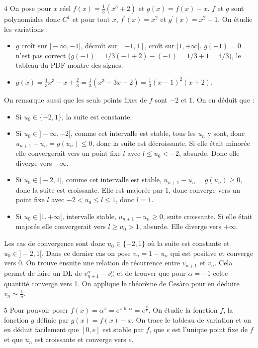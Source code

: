 \begin{correction}{4}
On pose pour $x$ réel $f(x)=\frac{1}{3}(x^{3}+2)$ et $g(x)=f(x)-x$.
$f$ et $g$ sont polynomiales donc $C^{1}$ et pour tout $x$, $f^{\prime}(x)=x^{2}$ et $g^{\prime}(x)=x^{2}-1$.
On étudie les variations :
\begin{itemize}
    \item $g$ croît sur $]-\infty, -1]$, décroît sur $[-1, 1]$, croît sur $[1, +\infty[$. $g(-1) = 0$ n'est pas correct ($g(-1) = 1/3(-1+2) - (-1) = 1/3+1 = 4/3$), le tableau du PDF montre des signes.
    \item $g(x) = \frac{1}{3}x^3 - x + \frac{2}{3} = \frac{1}{3}(x^3 - 3x + 2) = \frac{1}{3}(x-1)^2(x+2)$.
\end{itemize}
On remarque aussi que les seuls points fixes de $f$ sont $-2$ et $1$.
On en déduit que :
\begin{itemize}
    \item Si $u_{0}\in\{-2,1\}$, la suite est constante.
    \item Si $u_{0}\in]-\infty,-2[$, comme cet intervalle est stable, tous les $u_{n}$ y sont, donc $u_{n+1}-u_{n}=g(u_{n})\le0$, donc la suite est décroissante. Si elle était minorée elle convergerait vers un point fixe $l$ avec $l\le u_{0}<-2$, absurde. Donc elle diverge vers $-\infty$.
    \item Si $u_{0}\in]-2,1[$, comme cet intervalle est stable, $u_{n+1}-u_{n}=g(u_{n})\ge0$, donc la suite est croissante. Elle est majorée par 1, donc converge vers un point fixe $l$ avec $-2<u_{0}\le l\le1$, donc $l=1$.
    \item Si $u_{0}\in]1,+\infty[$, intervalle stable, $u_{n+1}-u_{n}\ge0$, suite croissante. Si elle était majorée elle convergerait vers $l \ge u_0 > 1$, absurde. Elle diverge vers $+\infty$.
\end{itemize}
Les cas de convergence sont donc $u_{0}\in\{-2,1\}$ où la suite est constante et $u_{0}\in]-2,1[$.
Dans ce dernier cas on pose $v_{n}=1-u_{n}$ qui est positive et converge vers 0.
On trouve ensuite une relation de récurrence entre $v_{n+1}$ et $v_{n}$.
Cela permet de faire un DL de $v_{n+1}^{\alpha}-v_{n}^{\alpha}$ et de trouver que pour $\alpha=-1$ cette quantité converge vers 1.
On applique le théorème de Cesàro pour en déduire $v_{n}\sim\frac{1}{n}$.
\end{correction}

\begin{correction}{5}
Pour pouvoir poser $f(x)=\alpha^{x}=e^{x \ln \alpha}=e^{\frac{x}{e}}$.
On étudie la fonction $f$, la fonction $g$ définie par $g(x)=f(x)-x$.
On trace le tableau de variation et on en déduit facilement que $[0, e]$ est stable par $f$, que $e$ est l'unique point fixe de $f$ et que $u_{n}$ est croissante et converge vers $e$.
\end{correction}

